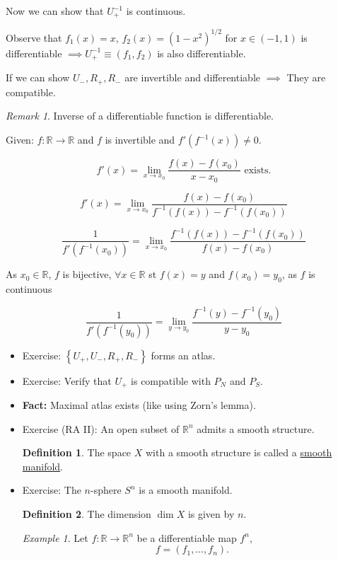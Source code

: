 \documentclass[11pt]{article}
\theoremstyle{definition}
\newtheorem{definition}{Definition}[section]
\theoremstyle{remark}
\newtheorem{remark}{Remark}[section]
\newtheorem{example}{Example}[section]
\begin{document}
Now we can show that $U_+^{-1}$ is continuous.

Observe that $f_1(x) = x$, $f_2(x) = (1 - x^2)^{1/2}$ for $x \in (-1, 1)$ is differentiable
$\implies U_+^{-1} \equiv (f_1, f_2)$ is also differentiable.

If we can show $U_-, R_+, R_-$ are invertible and differentiable $\implies$ They are compatible.

\begin{remark}\label{rem:inverse_diff}
Inverse of a differentiable function is differentiable.

Given: $f: \mathbb{R} \to \mathbb{R}$ and $f$ is invertible and $f'(f^{-1}(x)) \neq 0$.

\[
f'(x) = \lim_{x \to x_0} \frac{f(x) - f(x_0)}{x - x_0} \text{ exists.}
\]

\[
f'(x) = \lim_{x \to x_0} \frac{f(x) - f(x_0)}{f^{-1}(f(x)) - f^{-1}(f(x_0))}
\]

\[
\frac{1}{f'(f^{-1}(x_0))} = \lim_{x \to x_0} \frac{f^{-1}(f(x)) - f^{-1}(f(x_0))}{f(x) - f(x_0)}
\]

As $x_0 \in \mathbb{R}$, $f$ is bijective, $\forall x \in \mathbb{R}$ st $f(x) = y$ and $f(x_0) = y_0$, as $f$ is continuous

\[
\frac{1}{f'(f^{-1}(y_0))} = \lim_{y \to y_0} \frac{f^{-1}(y) - f^{-1}(y_0)}{y - y_0}
\]
\end{remark}

\begin{itemize}
    \item Exercise: $\left\{ U_+, U_-, R_+, R_- \right\}$ forms an atlas.

    \item Exercise: Verify that $U_+$ is compatible with $P_N$ and $P_S$.

    \item \textbf{Fact:} Maximal atlas exists (like using Zorn's lemma).

    \item Exercise (RA II): An open subset of $\mathbb{R}^n$ admits a smooth structure.

    \begin{definition}\label{def:smooth_manifold}
        The space $X$ with a smooth structure is called a \underline{smooth manifold}.
    \end{definition}

    \item Exercise: The $n$-sphere $S^n$ is a smooth manifold.

    \begin{definition}\label{def:dimension}
        The dimension $\dim X$ is given by $n$.
    \end{definition}

    \begin{example}\label{ex:diff_map}
        Let $f: \mathbb{R} \to \mathbb{R}^n$ be a differentiable map $f^n$,
        \[
        f = (f_1, \ldots, f_n).
        \]
    \end{example}
\end{itemize}
\end{document}
